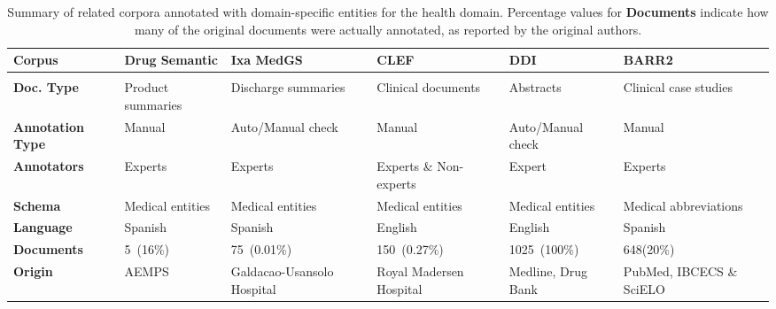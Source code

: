 \begin{table}[h!]\centering
  \footnotesize{
    \begin{tabularx}{\hsize}{X|XXXXX}
      \hline
      \hline
      \textbf{Corpus}          & \textbf{Drug Semantic} & \textbf{Ixa MedGS}         & \textbf{CLEF}           & \textbf{DDI}       & {\textbf{BARR2}}         \\
      \hline                                                                                                                                                   \\
      \textbf{Doc. Type}       & Product summaries      & Discharge summaries        & Clinical documents      & Abstracts          & Clinical case studies    \\
      \textbf{Annotation Type} & Manual                 & Auto/Manual check          & Manual                  & Auto/Manual check  & Manual                   \\
      \textbf{Annotators}      & Experts                & Experts                    & Experts \& Non-experts  & Expert             & Experts                  \\
      \textbf{Schema}          & Medical entities       & Medical entities           & Medical entities        & Medical entities   & Medical abbreviations    \\
      \textbf{Language}        & Spanish                & Spanish                    & English                 & English            & Spanish                  \\
      \textbf{Documents}       & 5~(16\%)               & 75~(0.01\%)                & 150~(0.27\%)            & 1025~(100\%)       & 648(20\%)                \\
      \textbf{Origin}          & AEMPS                  & Galdacao-Usansolo Hospital & Royal Madersen Hospital & Medline, Drug Bank & PubMed, IBCECS \& SciELO \\
      \hline
      \hline
    \end{tabularx}
  } %
  \caption{Summary of related corpora annotated with domain-specific entities for the health domain.
      {Percentage values for \textbf{Documents} indicate how many of the original documents were actually annotated, as reported by the original authors.} %
    \label{tab:stateofart}}
\end{table}


